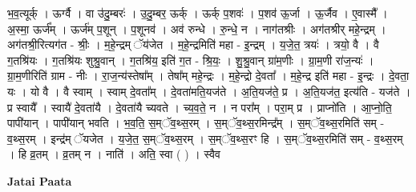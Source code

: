\documentclass[17pt]{extarticle}
\begin{document}
भ॒व॒त्यूर्क् । ऊर्ग्वै । वा उ॑दु॒म्बरः॑ । उ॒दु॒म्बर॒ ऊर्क् । ऊर्क् प॒शवः॑ । प॒शव॑ ऊ॒र्जा । ऊ॒र्जैव । ए॒वास्मै᳚ । अ॒स्मा॒ ऊर्ज᳚म् । ऊर्ज॑म् प॒शून् । प॒शूनव॑ । अव॑ रुन्धे । रु॒न्धे॒ न । नाग॑तश्रीः । अग॑तश्रीर् महे॒न्द्रम् । अग॑तश्री॒रित्यग॑त - श्रीः॒ । म॒हे॒न्द्रम् ॅय॑जेत । म॒हे॒न्द्रमिति॑ महा - इ॒न्द्रम् । य॒जे॒त॒ त्रयः॑ । त्रयो॒ वै । वै ग॒तश्रि॑यः । ग॒तश्रि॑यः शुश्रु॒वान् । ग॒तश्रि॑य॒ इति॑ ग॒त - श्रि॒यः॒ । शु॒श्रु॒वान् ग्रा॑म॒णीः । ग्रा॒म॒णी रा॑ज॒न्यः॑ । ग्रा॒म॒णीरिति॑ ग्राम - नीः । रा॒ज॒न्य॑स्तेषा᳚म् । तेषा᳚म् महे॒न्द्रः । म॒हे॒न्द्रो दे॒वता᳚ । म॒हे॒न्द्र इति॑ महा - इ॒न्द्रः । दे॒वता॒ यः । यो वै । वै स्वाम् । स्वाम् दे॒वता᳚म् । दे॒वता॑मति॒यज॑ते । अ॒ति॒यज॑ते॒ प्र । अ॒ति॒यज॑त॒ इत्य॑ति - यज॑ते । प्र स्वायै᳚ । स्वायै॑ दे॒वता॑यै । दे॒वता॑यै च्यवते । च्य॒व॒ते॒ न । न परा᳚म् । परा॒म् प्र । प्राप्नो॑ति । आ॒प्नो॒ति॒ पापी॑यान् । पापी॑यान् भवति । भ॒व॒ति॒ स॒म्ॅव॒थ्स॒रम् । स॒म्ॅव॒थ्स॒रमिन्द्र᳚म् । स॒म्ॅव॒थ्स॒रमिति॑ सम् - व॒थ्स॒रम् । इन्द्र॑म् ॅयजेत । य॒जे॒त॒ स॒म्ॅव॒थ्स॒रम् । स॒म्ॅव॒थ्स॒रꣳ हि । स॒म्ॅव॒थ्स॒रमिति॑ सम् - व॒थ्स॒रम् । हि व्र॒तम् । व्र॒तम् न । नाति॑ । अति॒ स्वा ( ) । स्वैव \newline

\textbf{Jatai Paata} \newline
\end{document}
